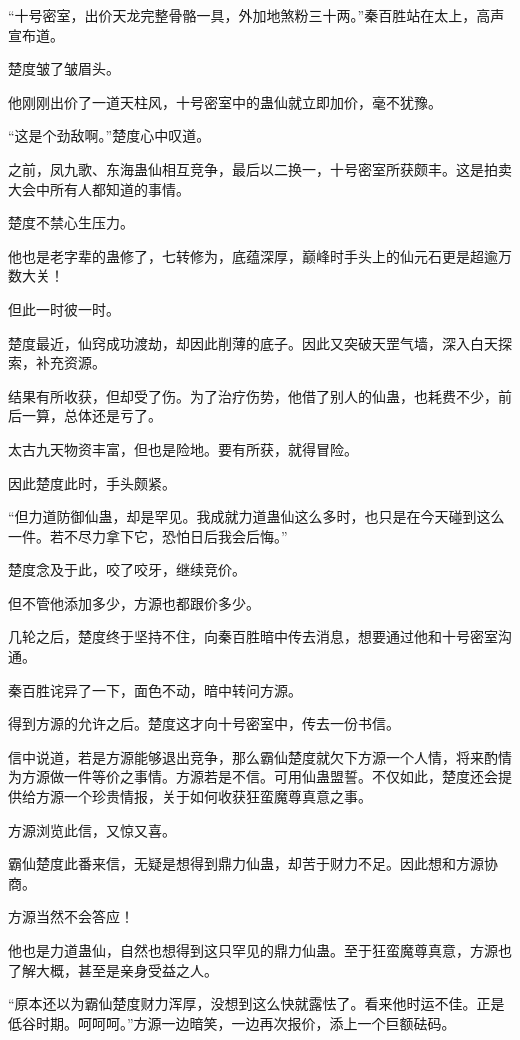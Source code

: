 
\begin{this_body}

“十号密室，出价天龙完整骨骼一具，外加地煞粉三十两。”秦百胜站在太上，高声宣布道。

楚度皱了皱眉头。

他刚刚出价了一道天柱风，十号密室中的蛊仙就立即加价，毫不犹豫。

“这是个劲敌啊。”楚度心中叹道。

之前，凤九歌、东海蛊仙相互竞争，最后以二换一，十号密室所获颇丰。这是拍卖大会中所有人都知道的事情。

楚度不禁心生压力。

他也是老字辈的蛊修了，七转修为，底蕴深厚，巅峰时手头上的仙元石更是超逾万数大关！

但此一时彼一时。

楚度最近，仙窍成功渡劫，却因此削薄的底子。因此又突破天罡气墙，深入白天探索，补充资源。

结果有所收获，但却受了伤。为了治疗伤势，他借了别人的仙蛊，也耗费不少，前后一算，总体还是亏了。

太古九天物资丰富，但也是险地。要有所获，就得冒险。

因此楚度此时，手头颇紧。

“但力道防御仙蛊，却是罕见。我成就力道蛊仙这么多时，也只是在今天碰到这么一件。若不尽力拿下它，恐怕日后我会后悔。”

楚度念及于此，咬了咬牙，继续竞价。

但不管他添加多少，方源也都跟价多少。

几轮之后，楚度终于坚持不住，向秦百胜暗中传去消息，想要通过他和十号密室沟通。

秦百胜诧异了一下，面色不动，暗中转问方源。

得到方源的允许之后。楚度这才向十号密室中，传去一份书信。

信中说道，若是方源能够退出竞争，那么霸仙楚度就欠下方源一个人情，将来酌情为方源做一件等价之事情。方源若是不信。可用仙蛊盟誓。不仅如此，楚度还会提供给方源一个珍贵情报，关于如何收获狂蛮魔尊真意之事。

方源浏览此信，又惊又喜。

霸仙楚度此番来信，无疑是想得到鼎力仙蛊，却苦于财力不足。因此想和方源协商。

方源当然不会答应！

他也是力道蛊仙，自然也想得到这只罕见的鼎力仙蛊。至于狂蛮魔尊真意，方源也了解大概，甚至是亲身受益之人。

“原本还以为霸仙楚度财力浑厚，没想到这么快就露怯了。看来他时运不佳。正是低谷时期。呵呵呵。”方源一边暗笑，一边再次报价，添上一个巨额砝码。


\end{this_body}
